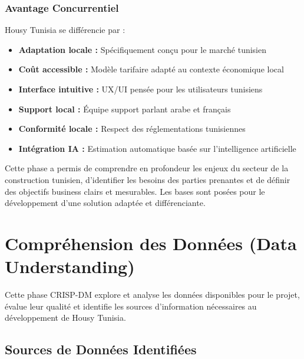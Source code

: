 \documentclass[12pt, a4paper]{report}
\begin{document}
\subsection{Avantage Concurrentiel}

Housy Tunisia se différencie par :

\begin{itemize}
    \item \textbf{Adaptation locale :} Spécifiquement conçu pour le marché tunisien
    \item \textbf{Coût accessible :} Modèle tarifaire adapté au contexte économique local
    \item \textbf{Interface intuitive :} UX/UI pensée pour les utilisateurs tunisiens
    \item \textbf{Support local :} Équipe support parlant arabe et français
    \item \textbf{Conformité locale :} Respect des réglementations tunisiennes
    \item \textbf{Intégration IA :} Estimation automatique basée sur l'intelligence artificielle
\end{itemize}

\begin{resultbox}
Cette phase a permis de comprendre en profondeur les enjeux du secteur de la construction tunisien, d'identifier les besoins des parties prenantes et de définir des objectifs business clairs et mesurables. Les bases sont posées pour le développement d'une solution adaptée et différenciante.
\end{resultbox}

\chapter{Compréhension des Données (Data Understanding)}

\begin{objectivebox}
Cette phase CRISP-DM explore et analyse les données disponibles pour le projet, évalue leur qualité et identifie les sources d'information nécessaires au développement de Housy Tunisia.
\end{objectivebox}

\section{Sources de Données Identifiées}
\end{document}
